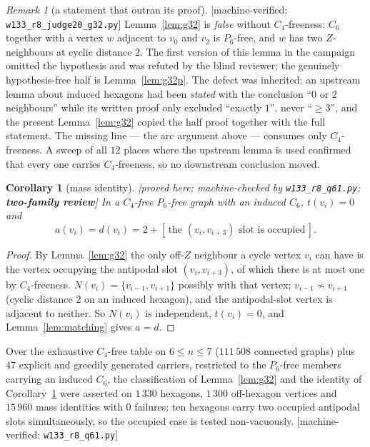 \documentclass[11pt]{article}
\theoremstyle{plain}
\newtheorem{corollary}[theorem]{Corollary}
\theoremstyle{definition}
\theoremstyle{remark}
\newtheorem{remark}[theorem]{Remark}
\numberwithin{equation}{section}
\newcommand{\statusbox}[1]{{\small\sloppy\textsf{[#1]}}}
\newcommand{\REV}[1]{\statusbox{proved here; machine-checked by \texttt{#1};
\textbf{two-family review}}}
\newcommand{\MV}[1]{\statusbox{machine-verified: \texttt{#1}}}
\begin{document}
\begin{remark}[a statement that outran its proof]\label{rem:g32false}
\MV{w133\_r8\_judge20\_g32.py}
Lemma~\ref{lem:g32} is \emph{false} without $C_4$-freeness: $C_6$ together with a vertex $w$
adjacent to $v_0$ and $v_2$ is $P_6$-free, and $w$ has two $Z$-neighbours at cyclic distance
$2$. The first version of this lemma in the campaign omitted the hypothesis and was refuted by
the blind reviewer; the genuinely hypothesis-free half is Lemma~\ref{lem:g32p}. The defect was
inherited: an upstream lemma about induced hexagons had been \emph{stated} with the
conclusion ``$0$ or $2$ neighbours'' while its written proof only excluded ``exactly $1$'',
never ``$\ge 3$'', and the present Lemma~\ref{lem:g32} copied the half proof together with the
full statement. The missing line --- the arc argument above --- consumes only
$C_4$-freeness. A sweep of all $12$ places where the upstream lemma is used confirmed that
every one carries $C_4$-freeness, so no downstream conclusion moved.
\end{remark}

\begin{corollary}[mass identity]\label{cor:g32.1}
\REV{w133\_r8\_q61.py}
In a $C_4$-free $P_6$-free graph with an induced $C_6$, $t(v_i) = 0$ and
\[
  a(v_i) = d(v_i) = 2 + [\,\text{the } (v_i,v_{i+3}) \text{ slot is occupied}\,].
\]
\end{corollary}

\begin{proof}
By Lemma~\ref{lem:g32} the only off-$Z$ neighbour a cycle vertex $v_i$ can have is the vertex
occupying the antipodal slot $(v_i,v_{i+3})$, of which there is at most one by
$C_4$-freeness. $N(v_i) = \{v_{i-1},v_{i+1}\}$ possibly with that vertex; $v_{i-1}\not\sim
v_{i+1}$ (cyclic distance $2$ on an induced hexagon), and the antipodal-slot vertex is
adjacent to neither. So $N(v_i)$ is independent, $t(v_i)=0$, and Lemma~\ref{lem:matching}
gives $a = d$.
\end{proof}

Over the exhaustive $C_4$-free table on $6 \le n \le 7$ ($111\,508$ connected graphs) plus
$47$ explicit and greedily generated carriers, restricted to the $P_6$-free members carrying
an induced $C_6$, the classification of Lemma~\ref{lem:g32} and the identity of
Corollary~\ref{cor:g32.1} were asserted on $1\,330$ hexagons, $1\,300$ off-hexagon vertices
and $15\,960$ mass identities with $0$ failures; ten hexagons carry two occupied antipodal
slots simultaneously, so the occupied case is tested non-vacuously. \MV{w133\_r8\_q61.py}
\end{document}
